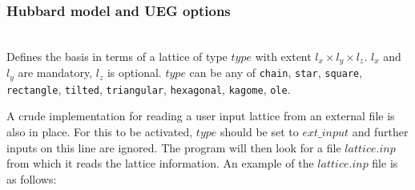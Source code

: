\documentclass[a4paper,notitlepage,dvipsnames]{scrreprt}
\newcommand\codeitem[1]{\needspace{1.5\baselineskip}\item[\textnormal{\ttfamily #1 \nopagebreak}] \hfill \\ \nopagebreak}
\begin{document}
  \subsubsection{Hubbard model and UEG options}
  \begin{description}
    \codeitem{lattice $type$ $l_x$ $l_y$ [$l_Z$]}
    Defines the basis in terms of a lattice of type $type$ with extent $l_x
    \times l_y \times l_z$. $l_x$ and $l_y$ are mandatory, $l_z$ is
    optional. $type$ can be any of \texttt{chain}, \texttt{star},
    \texttt{square}, \texttt{rectangle}, \texttt{tilted}, \texttt{triangular},
    \texttt{hexagonal}, \texttt{kagome}, \texttt{ole}.

    
		  A crude implementation for reading a user input lattice from an external file is also in place. 
		  For this to be activated, $type$ should be set to $ext\_input$ and further inputs on this line are ignored. 
		  The program will then look for a file $lattice.inp$ from which it reads the lattice information. 
		  An example of the $lattice.inp$ file is as follows:\\\\


\end{description}
\end{document}
